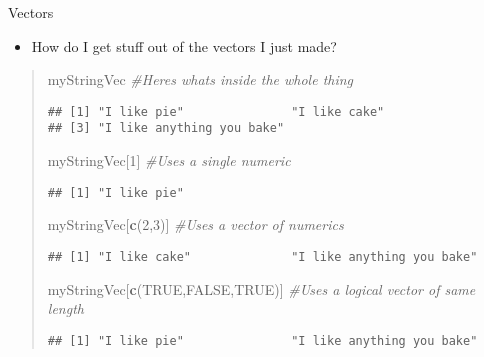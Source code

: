 \documentclass[
  ignorenonframetext,
  aspectratio=169]{beamer}
\newenvironment{Shaded}{\begin{snugshade}}{\end{snugshade}}
\newcommand{\CommentTok}[1]{\textcolor[rgb]{0.56,0.35,0.01}{\textit{#1}}}
\newcommand{\ConstantTok}[1]{\textcolor[rgb]{0.56,0.35,0.01}{#1}}
\newcommand{\DecValTok}[1]{\textcolor[rgb]{0.00,0.00,0.81}{#1}}
\newcommand{\FunctionTok}[1]{\textcolor[rgb]{0.13,0.29,0.53}{\textbf{#1}}}
\newcommand{\NormalTok}[1]{#1}
\providecommand{\tightlist}{%
  \setlength{\itemsep}{0pt}\setlength{\parskip}{0pt}}
\begin{document}
\begin{frame}[fragile]{Vectors}
\protect\hypertarget{vectors}{}
\begin{itemize}[<+->]
\tightlist
\item
  How do I get stuff out of the vectors I just made?
\end{itemize}

\footnotesize

\begin{quote}
\begin{Shaded}
\begin{Highlighting}[]
\NormalTok{myStringVec }\CommentTok{\#Here\textquotesingle{}s what\textquotesingle{}s inside the whole thing}
\end{Highlighting}
\end{Shaded}

\begin{verbatim}
## [1] "I like pie"               "I like cake"             
## [3] "I like anything you bake"
\end{verbatim}

\begin{Shaded}
\begin{Highlighting}[]
\NormalTok{myStringVec[}\DecValTok{1}\NormalTok{] }\CommentTok{\#Uses a single numeric}
\end{Highlighting}
\end{Shaded}

\begin{verbatim}
## [1] "I like pie"
\end{verbatim}

\begin{Shaded}
\begin{Highlighting}[]
\NormalTok{myStringVec[}\FunctionTok{c}\NormalTok{(}\DecValTok{2}\NormalTok{,}\DecValTok{3}\NormalTok{)] }\CommentTok{\#Uses a vector of numerics}
\end{Highlighting}
\end{Shaded}

\begin{verbatim}
## [1] "I like cake"              "I like anything you bake"
\end{verbatim}

\begin{Shaded}
\begin{Highlighting}[]
\NormalTok{myStringVec[}\FunctionTok{c}\NormalTok{(}\ConstantTok{TRUE}\NormalTok{,}\ConstantTok{FALSE}\NormalTok{,}\ConstantTok{TRUE}\NormalTok{)] }\CommentTok{\#Uses a logical vector of same length}
\end{Highlighting}
\end{Shaded}

\begin{verbatim}
## [1] "I like pie"               "I like anything you bake"
\end{verbatim}
\end{quote}

\normalsize
\end{frame}
\end{document}

